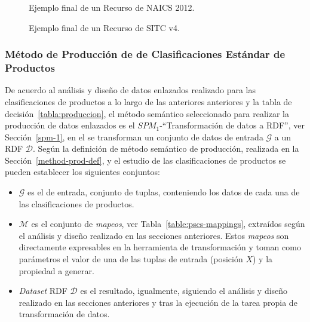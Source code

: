 \begin{figure}[!htp]

	\caption{Ejemplo final de un Recurso de NAICS 2012.}
	\label{fig:pscs-example-naics-2012}
\end{figure}


\begin{figure}[!htp]

	\caption{Ejemplo final de un Recurso de SITC v4.}
	\label{fig:pscs-example-sitc-v4}
\end{figure}

\subsubsection{Método de Producción de \linkeddata de Clasificaciones Estándar de Productos}
De acuerdo al análisis y diseño de datos enlazados realizado para las clasificaciones de productos 
a lo largo de las anteriores anteriores y la tabla de decisión~\ref{tabla:produccion}, el método semántico seleccionado 
para realizar la producción de datos enlazados es el $SPM_1$-``Transformación de datos a RDF'', ver Sección~\ref{spm-1}, en el 
se transforman un conjunto de datos de entrada $\mathcal{G}$ a un \dataset \gls{RDF} $\mathcal{D}$. Según la definición de método 
semántico de producción, realizada en la Sección~\ref{method-prod-def}, y el estudio de las clasificaciones de productos se pueden 
establecer los siguientes conjuntos:
\begin{itemize}
 \item $\mathcal{G}$ es el \dataset de entrada, conjunto de tuplas, conteniendo los datos de cada una de las clasificaciones de productos.
 \item $\mathcal{M}$ es el conjunto de \textit{mapeos}, ver Tabla~\ref{table:pscs-mappings}, extraídos según el análisis y diseño realizado en las secciones anteriores. Estos 
\textit{mapeos} son directamente expresables en la herramienta de transformación y toman como parámetros el valor de una de las tuplas de entrada (posición $X$) y la propiedad a generar.
 \item \textit{Dataset} RDF $\mathcal{D}$ es el \dataset resultado, igualmente, siguiendo el análisis y diseño realizado en las secciones anteriores y tras la ejecución 
de la tarea propia de transformación de datos.
\end{itemize}

